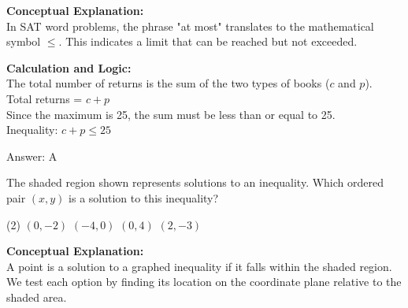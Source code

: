 \documentclass[11pt,paper=a4,answers]{exam}
\begin{document}
\begin{questions}
\begin{solution}
\textbf{Conceptual Explanation:} \\
In SAT word problems, the phrase "at most" translates to the mathematical symbol $\le$. This indicates a limit that can be reached but not exceeded.

\vspace{10pt}
\textbf{Calculation and Logic:} \\
The total number of returns is the sum of the two types of books ($c$ and $p$). \\
Total returns = $c + p$ \\
Since the maximum is 25, the sum must be less than or equal to 25. \\
Inequality: $c + p \le 25$

\vspace{15pt}
Answer: \colorbox{yellow!100}{A}
\end{solution}

\question
The shaded region shown represents solutions to an inequality. Which ordered pair $(x, y)$ is a solution to this inequality?

\begin{center}
\end{center}

\begin{tasks}(2)
    \task $(0, -2)$
    \task $(-4, 0)$
    \task $(0, 4)$
    \task $(2, -3)$
\end{tasks}

\begin{solution}
\textbf{Conceptual Explanation:} \\
A point is a solution to a graphed inequality if it falls within the shaded region. We test each option by finding its location on the coordinate plane relative to the shaded area.


\end{solution}
\end{questions}
\end{document}
